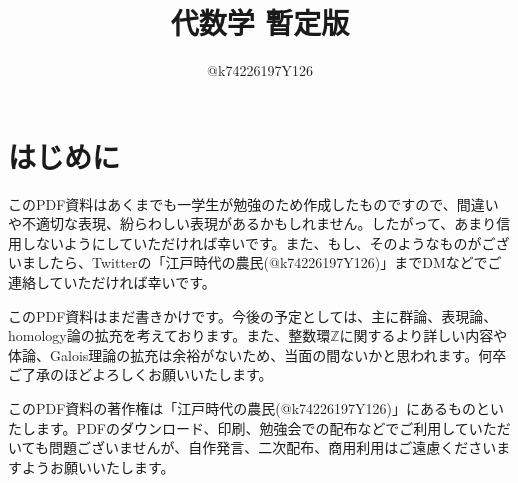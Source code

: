 \documentclass[10pt,a4paper,titlepage]{jsarticle}
\title{代数学 暫定版}
\author{@k74226197Y126}
\begin{document}
\maketitle
{}
\section*{はじめに}
このPDF資料はあくまでも一学生が勉強のため作成したものですので、間違いや不適切な表現、紛らわしい表現があるかもしれません。したがって、あまり信用しないようにしていただければ幸いです。また、もし、そのようなものがございましたら、Twitterの「江戸時代の農民(@k74226197Y126)」までDMなどでご連絡していただければ幸いです。\par
このPDF資料はまだ書きかけです。今後の予定としては、主に群論、表現論、homology論の拡充を考えております。また、整数環$\mathbb{Z}$に関するより詳しい内容や体論、Galois理論の拡充は余裕がないため、当面の間ないかと思われます。何卒ご了承のほどよろしくお願いいたします。\par
このPDF資料の著作権は「江戸時代の農民(@k74226197Y126)」にあるものといたします。PDFのダウンロード、印刷、勉強会での配布などでご利用していただいても問題ございませんが、自作発言、二次配布、商用利用はご遠慮くださいますようお願いいたします。
\tableofcontents
\clearpage
{}


\clearpage

\clearpage

\clearpage

\clearpage

\clearpage
\setcounter{section}{2}


\clearpage

\clearpage

\clearpage

\clearpage

\clearpage

\clearpage

\end{document}
